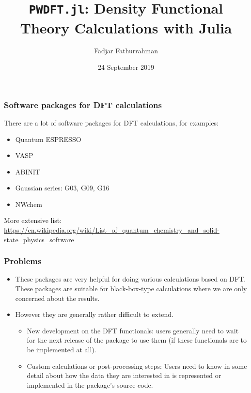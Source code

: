 \documentclass[english,9pt]{beamer}
\begin{document}
\title{\texttt{PWDFT.jl}: Density Functional Theory Calculations with Julia}
\author{Fadjar Fathurrahman}
\date{24 September 2019}

\frame{\titlepage}

\begin{frame}
\frametitle{Software packages for DFT calculations}

There are a lot of software packages for DFT calculations, for examples:

\begin{itemize}
\item Quantum ESPRESSO
\item VASP
\item ABINIT
\item Gaussian series: G03, G09, G16
\item NWchem
\end{itemize}

More extensive list:
\url{https://en.wikipedia.org/wiki/List_of_quantum_chemistry_and_solid-state_physics_software}

\end{frame}


\begin{frame}
\frametitle{Problems}

\begin{itemize}
\item These packages are very helpful for doing various calculations based on DFT.
%
These packages are suitable for black-box-type calculations where we are only concerned about the results.
%
\item However they are generally rather difficult to extend.
  \begin{itemize}
  \item New development on the DFT functionals:
  users generally need to wait for the next release of the package to use them
  (if these functionals are to be implemented at all).
  \item Custom calculations or post-processing steps:
  Users need to know in some detail
  about how the data they are interested in is represented or implemented in the package's source code.
  \end{itemize}
\end{itemize}

\end{frame}
\end{document}
